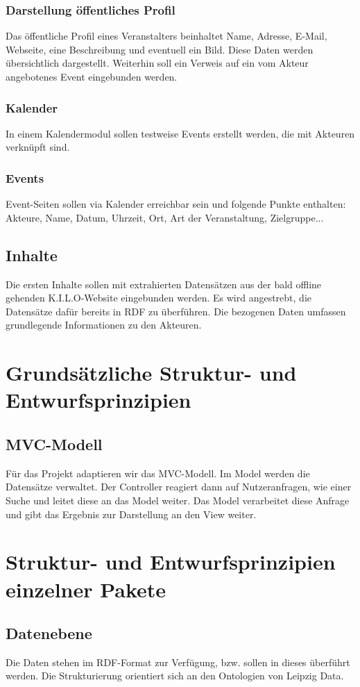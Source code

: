 \documentclass{swp}
\begin{document}
\subsubsection{Darstellung \"offentliches Profil}
Das \"offentliche Profil eines Veranstalters beinhaltet Name, Adresse, E-Mail, Webseite, eine Beschreibung und eventuell ein Bild. Diese Daten werden \"ubersichtlich dargestellt. Weiterhin soll ein Verweis auf ein vom Akteur angebotenes Event eingebunden werden.
\subsubsection{Kalender}
In einem Kalendermodul sollen testweise Events erstellt werden, die mit Akteuren verkn\"upft sind.
\subsubsection{Events}
Event-Seiten sollen via Kalender erreichbar sein und folgende Punkte enthalten: Akteure, Name, Datum, Uhrzeit, Ort, Art der Veranstaltung, Zielgruppe...

\subsection{Inhalte}
Die ersten Inhalte sollen mit extrahierten Datens\"atzen aus der bald offline gehenden K.I.L.O-Website eingebunden werden. Es wird angestrebt, die Datens\"atze daf\"ur bereits in RDF zu \"uberf\"uhren. Die bezogenen Daten umfassen grundlegende Informationen zu den Akteuren.

\section{Grunds\"atzliche Struktur- und Entwurfsprinzipien}
\subsection{MVC-Modell}
F\"ur das Projekt adaptieren wir das MVC-Modell. Im Model werden die Datens\"atze verwaltet. Der Controller reagiert dann auf Nutzeranfragen, wie einer Suche und leitet diese an das Model weiter. Das Model verarbeitet diese Anfrage und gibt das Ergebnis zur Darstellung an den View weiter.

\section{Struktur- und Entwurfsprinzipien einzelner Pakete}
\subsection{Datenebene}
Die Daten stehen im RDF-Format zur Verf\"ugung, bzw. sollen in dieses \"uberf\"uhrt werden. Die Strukturierung orientiert sich an den Ontologien von Leipzig Data.
\end{document}

